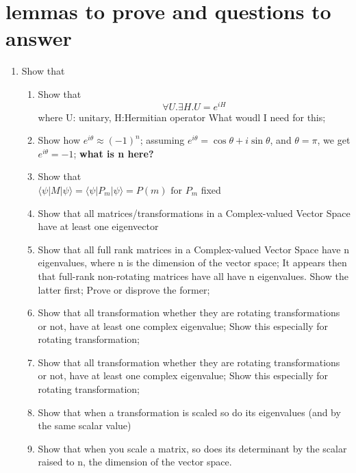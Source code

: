 \documentclass{article}
\begin{document}

\section{lemmas to prove and questions to answer}
\begin{enumerate}
    \item Show that
    \begin{enumerate}

	    \item Show that $$\forall U.  \exists H . U = e^{iH}$$ {\color[rgb]{0.9,0.9,0.9}where U: unitary, H:Hermitian operator} What woudl I need for this; 
	\item Show how $ e^{i\theta} \approx (-1)^n $; assuming $ e^{i\theta} = \cos \theta + i \sin \theta $, and $ \theta = \pi $, we get $e^{i\theta} = -1$; \textbf{what is n here?}

        \item Show that \\
        $\langle\psi|M|\psi\rangle = \langle\psi|P_m|\psi\rangle = P(m) \text{ for } P_m $ 
        fixed  


	\item Show that all matrices/transformations in a Complex-valued Vector Space have at least one eigenvector
	\item Show that all full rank matrices in a Complex-valued Vector Space have n eigenvalues, where n is the dimension of the vector space; It appears then that full-rank non-rotating matrices have all have n eigenvalues. Show the latter first; Prove or disprove the former;
	\item Show that all transformation whether they are rotating transformations or not, have at least one complex eigenvalue; Show this especially for  rotating transformation;

	\item Show that all transformation whether they are rotating transformations or not, have at least one complex eigenvalue; Show this especially for  rotating transformation;

	\item Show that when a transformation is scaled so do its eigenvalues (and by the same scalar value)
	\item Show that when you scale a matrix, so does its determinant by the scalar raised to n, the dimension of the vector space.



\end{enumerate}
\end{enumerate}
\end{document}
